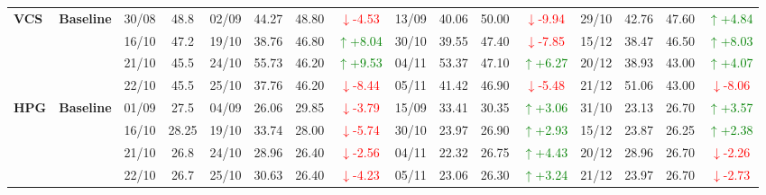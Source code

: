 {\begin{longtable}{llcc|cccc|cccc|cccc}
\multirow{4}{*}{\textbf{VCS}}
& \textbf{Baseline}
& 30/08 & 48.8 & 02/09 & 44.27 & 48.80 & \textcolor{red}{\(\downarrow\)-4.53} & 13/09 & 40.06 & 50.00 & \textcolor{red}{\(\downarrow\)-9.94} & 29/10 & 42.76 & 47.60 & \textcolor{green}{\(\uparrow\)+4.84} \\
& & 16/10 & 47.2 & 19/10 & 38.76 & 46.80 & \textcolor{green}{\(\uparrow\)+8.04} & 30/10 & 39.55 & 47.40 & \textcolor{red}{\(\downarrow\)-7.85} & 15/12 & 38.47 & 46.50 & \textcolor{green}{\(\uparrow\)+8.03} \\
& & 21/10 & 45.5 & 24/10 & 55.73 & 46.20 & \textcolor{green}{\(\uparrow\)+9.53} & 04/11 & 53.37 & 47.10 & \textcolor{green}{\(\uparrow\)+6.27} & 20/12 & 38.93 & 43.00 & \textcolor{green}{\(\uparrow\)+4.07} \\
& & 22/10 & 45.5 & 25/10 & 37.76 & 46.20 & \textcolor{red}{\(\downarrow\)-8.44} & 05/11 & 41.42 & 46.90 & \textcolor{red}{\(\downarrow\)-5.48} & 21/12 & 51.06 & 43.00 & \textcolor{red}{\(\downarrow\)-8.06} \\
\midrule

\multirow{4}{*}{\textbf{HPG}}
& \textbf{Baseline}
& 01/09 & 27.5 & 04/09 & 26.06 & 29.85 & \textcolor{red}{\(\downarrow\)-3.79} & 15/09 & 33.41 & 30.35 & \textcolor{green}{\(\uparrow\)+3.06} & 31/10 & 23.13 & 26.70 & \textcolor{green}{\(\uparrow\)+3.57} \\
& & 16/10 & 28.25 & 19/10 & 33.74 & 28.00 & \textcolor{red}{\(\downarrow\)-5.74} & 30/10 & 23.97 & 26.90 & \textcolor{green}{\(\uparrow\)+2.93} & 15/12 & 23.87 & 26.25 & \textcolor{green}{\(\uparrow\)+2.38} \\
& & 21/10 & 26.8 & 24/10 & 28.96 & 26.40 & \textcolor{red}{\(\downarrow\)-2.56} & 04/11 & 22.32 & 26.75 & \textcolor{green}{\(\uparrow\)+4.43} & 20/12 & 28.96 & 26.70 & \textcolor{red}{\(\downarrow\)-2.26} \\
& & 22/10 & 26.7 & 25/10 & 30.63 & 26.40 & \textcolor{red}{\(\downarrow\)-4.23} & 05/11 & 23.06 & 26.30 & \textcolor{green}{\(\uparrow\)+3.24} & 21/12 & 23.97 & 26.70 & \textcolor{red}{\(\downarrow\)-2.73} \\
\midrule


\end{longtable}}
